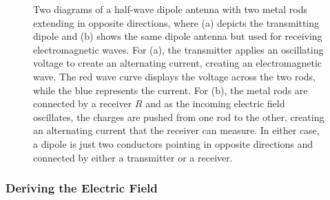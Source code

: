 \documentclass[10pt]{article}
\begin{document}
\begin{figure}[htp]
    \hspace*{\fill}%
    \hfill%
    \hspace*{\fill}%

    \bigskip
    
\caption{Two diagrams of a half-wave dipole antenna with two metal rods extending in opposite directions, where (a) depicts the transmitting dipole and (b) shows the same dipole antenna but used for receiving electromagnetic waves. For (a), the transmitter applies an oscillating voltage to create an alternating current, creating an electromagnetic wave. The red wave curve displays the voltage across the two rods, while the blue represents the current. For (b), the metal rods are connected by a receiver $R$ and as the incoming electric field oscillates, the charges are pushed from one rod to the other, creating an alternating current that the receiver can measure. In either case, a dipole is just two conductors pointing in opposite directions and connected by either a transmitter or a receiver\cite{transmitting_antenna}\cite{receiving_antenna}.}

\label{fig:dipole_antenna}
\end{figure}

\subsubsection{Deriving the Electric Field}
\label{derive_efield}
\end{document}
